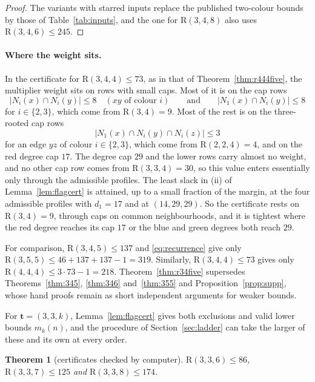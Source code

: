 \documentclass[11pt]{article}
\theoremstyle{spacedplain}
\newtheorem{theorem}{Theorem}[section]
\theoremstyle{spaceddef}
\theoremstyle{spacedremark}
\newcommand{\R}{\mathrm{R}}
\newcommand{\bt}{\mathbf{t}}
\begin{document}
\begin{proof}
The variants with starred inputs replace the published two-colour bounds by those of Table~\ref{tab:inputs}, and the one for $\R(3,4,8)$ also uses $\R(3,4,6)\le 245$.
\end{proof}

\paragraph{Where the weight sits.}
In the certificate for $\R(3,4,4)\le 73$, as in that of Theorem~\ref{thm:r444five}, the multiplier weight sits on rows with small caps.
Most of it is on the cap rows
\[
|N_i(x)\cap N_i(y)|\le 8\quad(xy\text{ of colour }i)\qquad\text{and}\qquad |N_1(x)\cap N_i(y)|\le 8
\]
for $i\in\{2,3\}$, which come from $\R(3,4)=9$.
Most of the rest is on the three-rooted cap rows
\[
|N_1(x)\cap N_i(y)\cap N_i(z)|\le 3
\]
for an edge $yz$ of colour $i\in\{2,3\}$, which come from $\R(2,2,4)=4$, and on the red degree cap $17$.
The degree cap $29$ and the lower rows carry almost no weight, and no other cap row comes from $\R(3,3,4)=30$, so this value enters essentially only through the admissible profiles.
The least slack in (ii) of Lemma~\ref{lem:flagcert} is attained, up to a small fraction of the margin, at the four admissible profiles with $d_1=17$ and at $(14,29,29)$.
So the certificate rests on $\R(3,4)=9$, through caps on common neighbourhoods, and it is tightest where the red degree reaches its cap $17$ or the blue and green degrees both reach $29$.

For comparison, $\R(3,4,5)\le 137$ and \eqref{eq:recurrence} give only $\R(3,5,5)\le 46+137+137-1=319$.
Similarly, $\R(3,4,4)\le 73$ gives only $\R(4,4,4)\le 3\cdot 73-1=218$.
Theorem~\ref{thm:r34five} supersedes Theorems~\ref{thm:345}, \ref{thm:346} and~\ref{thm:355} and Proposition~\ref{prop:supp}, whose hand proofs remain as short independent arguments for weaker bounds.

For $\bt=(3,3,k)$, Lemma~\ref{lem:flagcert} gives both exclusions and valid lower bounds $m_k(n)$, and the procedure of Section~\ref{sec:ladder} can take the larger of these and its own at every order.

\begin{theorem}[certificates checked by computer]\label{thm:flag678}
$\R(3,3,6)\le 86$, $\R(3,3,7)\le 125$ and $\R(3,3,8)\le 174$.
\end{theorem}
\end{document}

